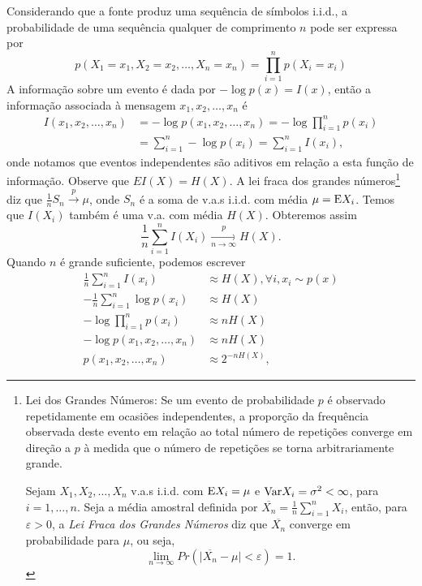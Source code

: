 Considerando que a fonte produz uma sequência de símbolos i.i.d., a probabilidade de uma
sequência qualquer de comprimento $n$ pode ser expressa por
\begin{equation}
p(X_1 = x_1, X_2 = x_2, \ldots, X_n = x_n) = \prod_{i=1}^{n} p(X_i = x_i)
\end{equation}
A informação sobre um evento é dada por $-\log p(x) = I(x)$, então a informação
associada à mensagem $x_1,x_2,\ldots,x_n$ é 
\begin{subequations}
  \begin{align}
    I(x_1,x_2,\ldots,x_n) &= - \log p(x_1, x_2, \ldots, x_n) = - \log \prod_{i=1}^n p(x_i) \\
                          &= \sum_{i=1}^n - \log p(x_i) = \sum_{i=1}^n I(x_i),
  \end{align}
\end{subequations}
onde notamos que eventos independentes são aditivos em relação a esta função de informação.
Observe que $E I(X) = H(X)$.
A lei fraca dos grandes números\footnote{
Lei dos Grandes Números: 
Se um evento de probabilidade $p$ é observado repetidamente em ocasiões independentes,
a proporção da frequência observada deste evento em relação ao total número de repetições
converge em direção a $p$ à medida que o número de repetições se torna arbitrariamente grande.

Sejam $X_1, X_2, \ldots, X_n$ v.a.s i.i.d. com $\mathrm{E} X_i = \mu$ e $\mathrm{Var} X_i = \sigma^2 < \infty$, para $i=1,\ldots,n$.
Seja a média amostral definida por $\overline{X_n} = \frac{1}{n} \sum_{i=1}^{n} X_i$, então, para $\varepsilon > 0$,
a \emph{Lei Fraca dos Grandes Números} diz que $\overline{X_n}$ converge em probabilidade para $\mu$, ou seja,
\begin{equation}
\lim_{n \rightarrow \infty} Pr \left( \vert \overline{X_n} - \mu \vert < \varepsilon  \right) = 1 .
\end{equation}
}
diz que $\frac{1}{n} S_n \xrightarrow{p} \mu$, onde $S_n$ é a soma
de v.a.s i.i.d. com média $\mu = \mathrm{E} X_i$. Temos que $I(X_i)$ também é uma v.a. com média $H(X)$.
Obteremos assim
\begin{equation}
  \frac{1}{n} \sum_{i=1}^n I(X_i) \xrightarrow[n \rightarrow \infty]{p} H(X) .
\end{equation}
Quando $n$ é grande suficiente, podemos escrever
\begin{subequations}\label{eq:nIHcpn}
  \begin{align}
     \frac{1}{n} \sum_{i=1}^n I(x_i)        &\approx H(X) , \forall i, x_i \sim p(x) \\
     - \frac{1}{n} \sum_{i=1}^n \log p(x_i) &\approx H(X) \label{eq:nIHcpnb}\\
     - \log \prod_{i=1}^n p(x_i)            &\approx n H(X) \label{eq:nIHcpnc}\\
     - \log p(x_1,x_2,\ldots,x_n)           &\approx n H(X) \label{eq:nIHcpnd}\\
     p(x_1,x_2,\ldots,x_n)                  &\approx 2^{-nH(X)} , \label{eq:nIHcpe}
  \end{align}
\end{subequations}
